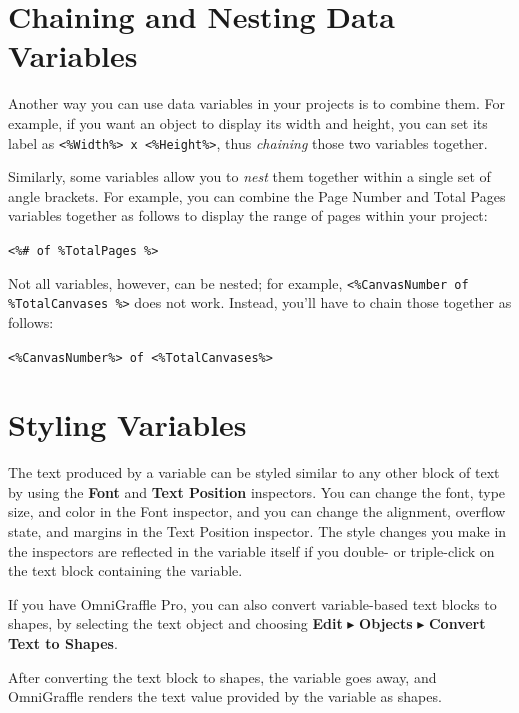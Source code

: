 \documentclass[../main.tex]{subfiles}
\begin{document}
\section{Chaining and Nesting Data Variables}

Another way you can use data variables in your projects is to combine them. For example, if you
want an object to display its width and height, you can set its label as \texttt{<\%Width\%> x
<\%Height\%>}, thus \textit{chaining} those two variables together.

Similarly, some variables allow you to \textit{nest} them together within a single set of angle
brackets. For example, you can combine the Page Number and Total Pages variables together as
follows to display the range of pages within your project:

\texttt{<\%\# of \%TotalPages \%>}

Not all variables, however, can be nested; for example, \texttt{<\%CanvasNumber of
\%TotalCanvases \%>} does not work. Instead, you'll have to chain those together as follows:

\texttt{<\%CanvasNumber\%> of <\%TotalCanvases\%>}

\section{Styling Variables}

The text produced by a variable can be styled similar to any other block of text by using the
\textbf{Font} and \textbf{Text Position} inspectors. You can change the font, type size, and
color in the Font inspector, and you can change the alignment, overflow state, and margins in
the Text Position inspector. The style changes you make in the inspectors are reflected in the
variable itself if you double- or triple-click on the text block containing the variable.


\begin{ogpro}
  If you have OmniGraffle Pro, you can also convert variable-based text blocks to shapes, by
  selecting the text object and choosing \textbf{Edit} $\blacktriangleright$ \textbf{Objects}
  $\blacktriangleright$ \textbf{Convert Text to Shapes}.

  After converting the text block to shapes, the variable goes away, and OmniGraffle renders the
  text value provided by the variable as shapes.
\end{ogpro}
\end{document}
